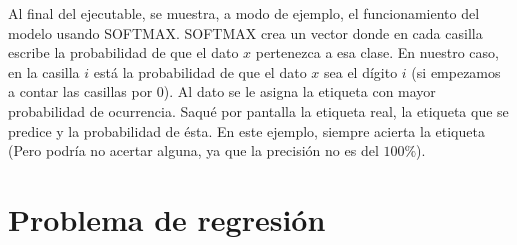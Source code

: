 \documentclass{article}
\begin{document}
Al final del ejecutable, se muestra, a modo de ejemplo, el funcionamiento del modelo usando SOFTMAX. SOFTMAX crea un vector donde en cada casilla escribe la probabilidad de que el dato $x$ pertenezca a esa clase. En nuestro caso, en la casilla $i$ está la probabilidad de que el dato $x$ sea el dígito $i$ (si empezamos a contar las casillas por $0$). Al dato se le asigna la etiqueta con mayor probabilidad de ocurrencia. Saqué por pantalla la etiqueta real, la etiqueta que se predice y la probabilidad de ésta. En este ejemplo, siempre acierta la etiqueta (Pero podría no acertar alguna, ya que la precisión no es del $100\%$).

\newpage
\section{Problema de regresión}
\end{document}
